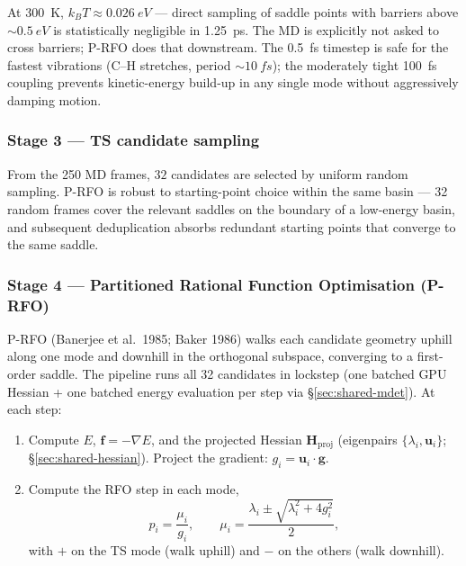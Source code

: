 At \SI{300}{K}, $k_B T \approx \SI{0.026}{eV}$ --- direct sampling of saddle points with barriers above $\sim \SI{0.5}{eV}$ is statistically negligible in \SI{1.25}{ps}. The MD is explicitly not asked to cross barriers; P-RFO does that downstream. The \SI{0.5}{fs} timestep is safe for the fastest vibrations (C--H stretches, period $\sim \SI{10}{fs}$); the moderately tight \SI{100}{fs} coupling prevents kinetic-energy build-up in any single mode without aggressively damping motion.


\subsubsection{Stage 3 --- TS candidate sampling}
\label{sec:pes-candidates}

From the 250 MD frames, $32$ candidates are selected by uniform random sampling. P-RFO is robust to starting-point choice within the same basin --- 32 random frames cover the relevant saddles on the boundary of a low-energy basin, and subsequent deduplication absorbs redundant starting points that converge to the same saddle.


\subsubsection{Stage 4 --- Partitioned Rational Function Optimisation (P-RFO)}
\label{sec:pes-prfo}

P-RFO (Banerjee et al.\ 1985; Baker 1986) walks each candidate geometry uphill along one mode and downhill in the orthogonal subspace, converging to a first-order saddle. The pipeline runs all 32 candidates in lockstep (one batched GPU Hessian + one batched energy evaluation per step via \S\ref{sec:shared-mdet}). At each step:

\begin{enumerate}
    \item Compute $E$, $\mathbf{f} = -\nabla E$, and the projected Hessian $\mathbf{H}_\text{proj}$ (eigenpairs $\{\lambda_i, \mathbf{u}_i\}$; \S\ref{sec:shared-hessian}). Project the gradient: $g_i = \mathbf{u}_i \cdot \mathbf{g}$.
    \item Compute the RFO step in each mode,
    \begin{equation}
        p_i = \frac{\mu_i}{g_i}, \qquad \mu_i = \frac{\lambda_i \pm \sqrt{\lambda_i^2 + 4 g_i^2}}{2},
    \end{equation}
    with $+$ on the TS mode (walk uphill) and $-$ on the others (walk downhill).
\end{enumerate}

